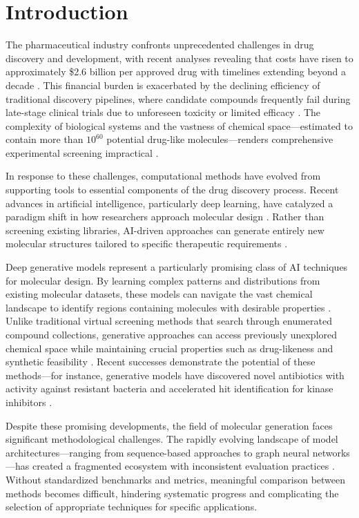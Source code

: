 \documentclass[conference]{IEEEtran}
\begin{document}
\section{Introduction}
The pharmaceutical industry confronts unprecedented challenges in drug discovery and development, with recent analyses revealing that costs have risen to approximately \$2.6 billion per approved drug with timelines extending beyond a decade \cite{DiMasi2016}. This financial burden is exacerbated by the declining efficiency of traditional discovery pipelines, where candidate compounds frequently fail during late-stage clinical trials due to unforeseen toxicity or limited efficacy \cite{Waring2015, Mullard2016}. The complexity of biological systems and the vastness of chemical space—estimated to contain more than $10^{60}$ potential drug-like molecules—renders comprehensive experimental screening impractical \cite{Polishchuk2013}.

In response to these challenges, computational methods have evolved from supporting tools to essential components of the drug discovery process. Recent advances in artificial intelligence, particularly deep learning, have catalyzed a paradigm shift in how researchers approach molecular design \cite{Schneider2020, Vamathevan2019}. Rather than screening existing libraries, AI-driven approaches can generate entirely new molecular structures tailored to specific therapeutic requirements \cite{Chen2018}.

Deep generative models represent a particularly promising class of AI techniques for molecular design. By learning complex patterns and distributions from existing molecular datasets, these models can navigate the vast chemical landscape to identify regions containing molecules with desirable properties \cite{Elton2019, LosRamos2019}. Unlike traditional virtual screening methods that search through enumerated compound collections, generative approaches can access previously unexplored chemical space while maintaining crucial properties such as drug-likeness and synthetic feasibility \cite{Sanchez-Lengeling2018, Walters2020}. Recent successes demonstrate the potential of these methods—for instance, generative models have discovered novel antibiotics with activity against resistant bacteria \cite{Stokes2020} and accelerated hit identification for kinase inhibitors \cite{Zhavoronkov2019}.

Despite these promising developments, the field of molecular generation faces significant methodological challenges. The rapidly evolving landscape of model architectures—ranging from sequence-based approaches to graph neural networks—has created a fragmented ecosystem with inconsistent evaluation practices \cite{Brown2019, Meyers2021}. Without standardized benchmarks and metrics, meaningful comparison between methods becomes difficult, hindering systematic progress and complicating the selection of appropriate techniques for specific applications.
\end{document}
